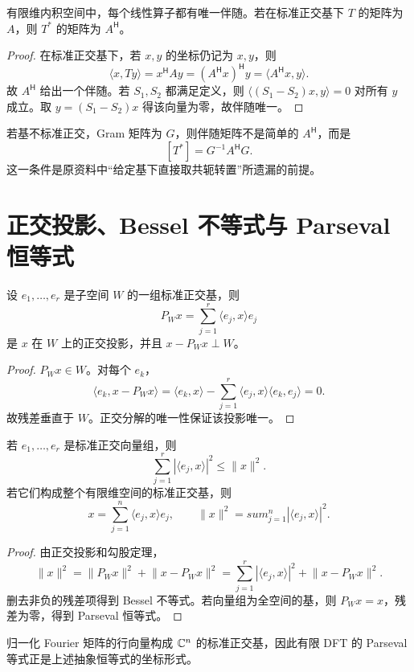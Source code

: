 \begin{theorem}[伴随的存在唯一性与矩阵表示]
有限维内积空间中，每个线性算子都有唯一伴随。若在标准正交基下 $T$ 的矩阵为 $A$，则 $T^*$ 的矩阵为 $A^{\mathsf H}$。
\end{theorem}
\begin{proof}
在标准正交基下，若 $x,y$ 的坐标仍记为 $x,y$，则
\[
\langle x,Ty\rangle=x^{\mathsf H}Ay
=(A^{\mathsf H}x)^{\mathsf H}y
=\langle A^{\mathsf H}x,y\rangle.
\]
故 $A^{\mathsf H}$ 给出一个伴随。若 $S_1,S_2$ 都满足定义，则
$\langle(S_1-S_2)x,y\rangle=0$ 对所有 $y$ 成立。取
$y=(S_1-S_2)x$ 得该向量为零，故伴随唯一。
\end{proof}

若基不标准正交，Gram 矩阵为 $G$，则伴随矩阵不是简单的 $A^{\mathsf H}$，而是
\[
[T^*]=G^{-1}A^{\mathsf H}G.
\]
这一条件是原资料中“给定基下直接取共轭转置”所遗漏的前提。

\section{正交投影、Bessel 不等式与 Parseval 恒等式}

\begin{theorem}[正交投影公式]
设 $e_1,\ldots,e_r$ 是子空间 $W$ 的一组标准正交基，则
\[
P_Wx=\sum_{j=1}^r\langle e_j,x\rangle e_j
\]
是 $x$ 在 $W$ 上的正交投影，并且
$x-P_Wx\perp W$。
\end{theorem}
\begin{proof}
$P_Wx\in W$。对每个 $e_k$，
\[
\langle e_k,x-P_Wx\rangle
=\langle e_k,x\rangle-
\sum_{j=1}^r\langle e_j,x\rangle\langle e_k,e_j\rangle=0.
\]
故残差垂直于 $W$。正交分解的唯一性保证该投影唯一。
\end{proof}

\begin{theorem}
若 $e_1,\ldots,e_r$ 是标准正交向量组，则
\[
\sum_{j=1}^r|\langle e_j,x\rangle|^2\le\lVert x\rVert^2.
\]
若它们构成整个有限维空间的标准正交基，则
\[
x=\sum_{j=1}^n\langle e_j,x\rangle e_j,
\qquad
\lVert x\rVert^2=sum_{j=1}^n|\langle e_j,x\rangle|^2.
\]
\end{theorem}
\begin{proof}
由正交投影和勾股定理，
\[
\lVert x\rVert^2
=\lVert P_Wx\rVert^2+\lVert x-P_Wx\rVert^2
=\sum_{j=1}^r|\langle e_j,x\rangle|^2
+\lVert x-P_Wx\rVert^2.
\]
删去非负的残差项得到 Bessel 不等式。若向量组为全空间的基，则 $P_Wx=x$，残差为零，得到 Parseval 恒等式。
\end{proof}

归一化 Fourier 矩阵的行向量构成 $\mathbb{C}^n$ 的标准正交基，因此有限 DFT 的 Parseval 等式正是上述抽象恒等式的坐标形式。

